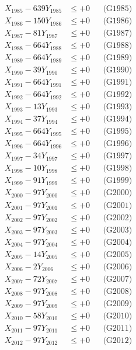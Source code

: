 \documentclass[a4paper,10pt]{article}
\begin{document}
{\begin{align}
X_{1985} - 639Y_{1985} &\leq +0 && \text{(G1985)} \\
X_{1986} - 150Y_{1986} &\leq +0 && \text{(G1986)} \\
X_{1987} - 81Y_{1987} &\leq +0 && \text{(G1987)} \\
X_{1988} - 664Y_{1988} &\leq +0 && \text{(G1988)} \\
X_{1989} - 664Y_{1989} &\leq +0 && \text{(G1989)} \\
X_{1990} - 39Y_{1990} &\leq +0 && \text{(G1990)} \\
\allowbreak
X_{1991} - 664Y_{1991} &\leq +0 && \text{(G1991)} \\
X_{1992} - 664Y_{1992} &\leq +0 && \text{(G1992)} \\
X_{1993} - 13Y_{1993} &\leq +0 && \text{(G1993)} \\
X_{1994} - 37Y_{1994} &\leq +0 && \text{(G1994)} \\
X_{1995} - 664Y_{1995} &\leq +0 && \text{(G1995)} \\
X_{1996} - 664Y_{1996} &\leq +0 && \text{(G1996)} \\
X_{1997} - 34Y_{1997} &\leq +0 && \text{(G1997)} \\
X_{1998} - 10Y_{1998} &\leq +0 && \text{(G1998)} \\
X_{1999} - 91Y_{1999} &\leq +0 && \text{(G1999)} \\
X_{2000} - 97Y_{2000} &\leq +0 && \text{(G2000)} \\
\allowbreak
X_{2001} - 97Y_{2001} &\leq +0 && \text{(G2001)} \\
X_{2002} - 97Y_{2002} &\leq +0 && \text{(G2002)} \\
X_{2003} - 97Y_{2003} &\leq +0 && \text{(G2003)} \\
X_{2004} - 97Y_{2004} &\leq +0 && \text{(G2004)} \\
X_{2005} - 14Y_{2005} &\leq +0 && \text{(G2005)} \\
X_{2006} - 2Y_{2006} &\leq +0 && \text{(G2006)} \\
X_{2007} - 72Y_{2007} &\leq +0 && \text{(G2007)} \\
X_{2008} - 97Y_{2008} &\leq +0 && \text{(G2008)} \\
X_{2009} - 97Y_{2009} &\leq +0 && \text{(G2009)} \\
X_{2010} - 58Y_{2010} &\leq +0 && \text{(G2010)} \\
\allowbreak
X_{2011} - 97Y_{2011} &\leq +0 && \text{(G2011)} \\
X_{2012} - 97Y_{2012} &\leq +0 && \text{(G2012)} \\

\end{align}}
\end{document}
